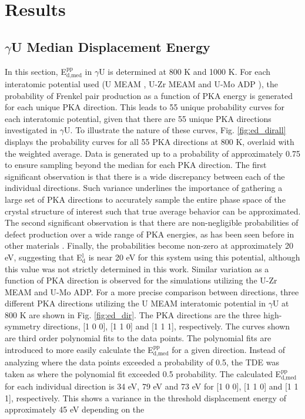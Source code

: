 \documentclass[review]{elsarticle}
\begin{document}
\FloatBarrier

\section{Results}
\subsection{$\gamma$U Median Displacement Energy}

In this section, E$^{\textrm{pp}}_{\textrm{d,med}}$ in $\gamma$U is determined at 800 K and 1000 K. For each interatomic potential used (U MEAM \cite{beeler_meam}, U-Zr MEAM \cite{moore2015} and U-Mo ADP \cite{smirnovaADP}), the probability of Frenkel pair production as a function of PKA energy is generated for each unique PKA direction. This leads to 55 unique probability curves for each interatomic potential, given that there are 55 unique PKA directions investigated in $\gamma$U. To illustrate the nature of these curves, Fig. \ref{fig:ed_dirall} displays the probability curves for all 55 PKA directions at 800 K, overlaid with the weighted average. Data is generated up to a probability of approximately 0.75 to ensure sampling beyond the median for each PKA direction. The first significant observation is that there is a wide discrepancy between each of the individual directions. Such variance underlines the importance of gathering a large set of PKA directions to accurately sample the entire phase space of the crystal structure of interest such that true average behavior can be approximated. The second significant observation is that there are non-negligible probabilities of defect production over a wide range of PKA energies, as has been seen before in other materials \cite{beeler2016, nordlund2006, zepeda-ruiz2003, tsuchihira2013}. Finally, the probabilities become non-zero at approximately 20 eV, suggesting that E$^{\textrm{l}}_{\textrm{d}}$ is near 20 eV for this system using this potential, although this value was not strictly determined in this work. Similar variation as a function of PKA direction is observed for the simulations utilizing the U-Zr MEAM and U-Mo ADP. For a more precise comparison between directions, three different PKA directions utilizing the U MEAM interatomic potential in $\gamma$U at 800 K are shown in Fig. \ref{fig:ed_dir}. The PKA directions are the three high-symmetry directions, [1 0 0], [1 1 0] and [1 1 1], respectively. The curves shown are third order polynomial fits to the data points. The polynomial fits are introduced to more easily calculate the E$^{\textrm{pp}}_{\textrm{d,med}}$ for a given direction. Instead of analyzing where the data points exceeded a probability of 0.5, the TDE was taken as where the polynomial fit exceeded 0.5 probability. The calculated E$^{\textrm{pp}}_{\textrm{d,med}}$ for each individual direction is 34 eV, 79 eV and 73 eV for [1 0 0], [1 1 0] and [1 1 1], respectively. This shows a variance in the threshold displacement energy of approximately 45 eV depending on the 
\end{document}

